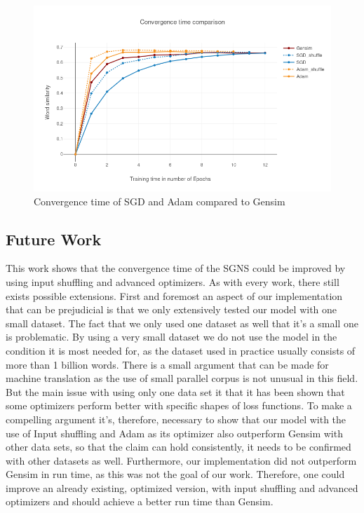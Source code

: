 \begin{figure}[h]
\centering
\includegraphics[scale=0.3]{images/gensim_vs_adam}
\caption{Convergence time of SGD and Adam compared to Gensim}
\label{fig:gensim_vs_adam}
\end{figure}

\subsection{Future Work}
This work shows that the convergence time of the SGNS could be improved by using input shuffling and advanced optimizers. As with every work, there still exists possible extensions. First and foremost an aspect of our implementation that can be prejudicial is that we only extensively tested our model with one small dataset. The fact that we only used one dataset as well that it's a small one is problematic. By using a very small dataset we do not use the model in the condition it is most needed for, as the dataset used in practice usually consists of more than 1 billion words. There is a small argument that can be made for machine translation as the use of small parallel corpus is not unusual in this field. But the main issue with using only one data set it that it has been shown that some optimizers perform better with specific shapes of loss functions. To make a compelling argument it's, therefore, necessary to show that our model with the use of Input shuffling and Adam as its optimizer also outperform Gensim with other data sets, so that the claim can hold consistently, it needs to be confirmed with other datasets as well.
Furthermore, our implementation did not outperform Gensim in run time, as this was not the goal of our work. Therefore, one could improve an already existing, optimized version, with input shuffling and advanced optimizers and should achieve a better run time than Gensim.